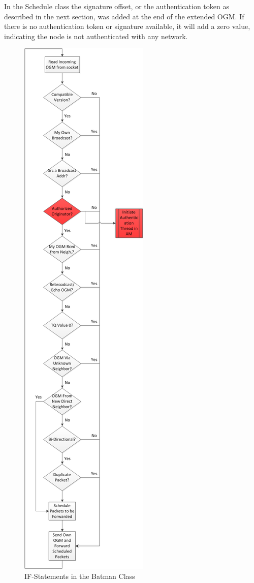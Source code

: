 In the Schedule class the signature offset, or the authentication token as
described in the next section, was added at the end of the extended \ac{OGM}. If
there is no authentication token or signature available, it will add a zero
value, indicating the node is not authenticated with any network.

\begin{figure}[h]
	\centering
	\includegraphics[totalheight=1\textheight]{images/batman_if_statements.png}
	\caption{IF-Statements in the Batman Class}
	\label{fig:batman_if_statements}
\end{figure}

